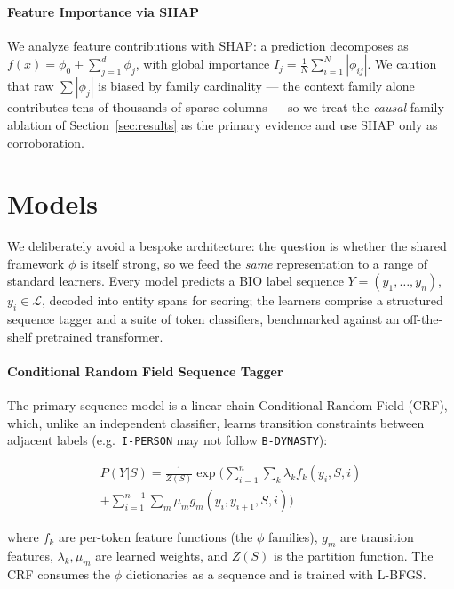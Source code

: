 \documentclass[conference]{IEEEtran}
\begin{document}
\paragraph{Feature Importance via SHAP}

We analyze feature contributions with SHAP: a prediction decomposes as \(f(x) = \phi_0 + \sum_{j=1}^{d}\phi_j\), with global importance \(I_j = \frac{1}{N}\sum_{i=1}^{N} |\phi_{ij}|\). We caution that raw $\sum|\phi_j|$ is biased by family cardinality --- the context family alone contributes tens of thousands of sparse columns --- so we treat the \emph{causal} family ablation of Section~\ref{sec:results} as the primary evidence and use SHAP only as corroboration.

\section{Models}
\label{sec:models}

We deliberately avoid a bespoke architecture: the question is whether the shared framework $\phi$ is itself strong, so we feed the \emph{same} representation to a range of standard learners. Every model predicts a BIO label sequence $Y=(y_1,\dots,y_n)$, $y_i\in\mathcal{L}$, decoded into entity spans for scoring; the learners comprise a structured sequence tagger and a suite of token classifiers, benchmarked against an off-the-shelf pretrained transformer.

\paragraph{Conditional Random Field Sequence Tagger}

The primary sequence model is a linear-chain Conditional Random Field (CRF), which, unlike an independent classifier, learns transition constraints between adjacent labels (e.g.\ \texttt{I-PERSON} may not follow \texttt{B-DYNASTY}):

\begin{multline*}
P(Y|S) =
\frac{1}{Z(S)}
\exp\!\Biggl(
\sum_{i=1}^{n}\sum_k \lambda_k f_k(y_i, S, i)\\
+
\sum_{i=1}^{n-1}\sum_m \mu_m g_m(y_i, y_{i+1}, S, i)
\Biggr)
\end{multline*}

where $f_k$ are per-token feature functions (the $\phi$ families), $g_m$ are transition features, $\lambda_k,\mu_m$ are learned weights, and $Z(S)$ is the partition function. The CRF consumes the $\phi$ dictionaries as a sequence and is trained with L-BFGS.
\end{document}
